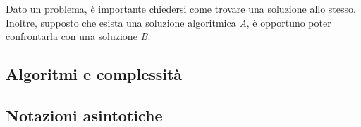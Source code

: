 \documentclass{subfiles}
\begin{document}
Dato un problema, è importante chiedersi come trovare una soluzione allo stesso.
Inoltre, supposto che esista una soluzione algoritmica \emph{A}, è opportuno poter confrontarla con una soluzione \emph{B}.

\subsection{Algoritmi e complessità}


\subsection{Notazioni asintotiche}

\clearpage
\end{document}

